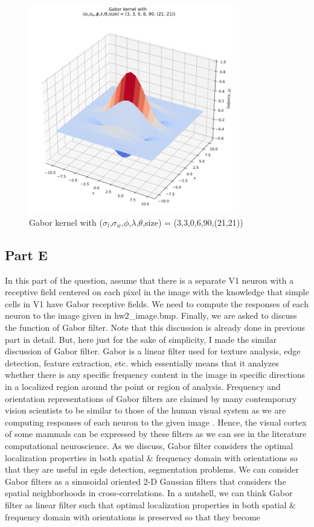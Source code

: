 \documentclass[12pt]{amsart}
\begin{document}
\begin{figure}[ht]
    \centering
    \includegraphics[width = 0.8\textwidth]{images/Gabor_90_3d.png}
    \caption{Gabor kernel with ($\sigma_l$,$\sigma_w$,$\phi$,$\lambda$,$\theta$,size) = (3,3,0,6,90,(21,21))}
\end{figure}

\subsection{Part E}
In this part of the question, assume that there is a separate V1 neuron with a receptive field centered on each pixel in the image with the knowledge that simple cells in V1 have Gabor receptive fields. We need to compute the responses of each neuron to the image given in hw2\_image.bmp. Finally, we are asked to discuss the function of Gabor filter. Note that this discussion is already done in previous part in detail. But, here just for the sake of simplicity, I made the similar discussion of Gabor filter. Gabor is a linear filter used for texture analysis, edge detection, feature extraction, etc. which essentially means that it analyzes whether there is any specific frequency content in the image in specific directions in a localized region around the point or region of analysis\cite{enwiki:993157632}. Frequency and orientation representations of Gabor filters are claimed by many contemporary vision scientists to be similar to those of the human visual system \cite{enwiki:993157632} as we are computing responses of each neuron to the given image . Hence, the visual cortex of some mammals can be expressed by these filters as we can see in the literature computational neuroscience. As we discuss, Gabor filter considers the optimal localization properties in both spatial \& frequency domain with orientations so that they are useful in egde detection, segmentation problems. We can consider Gabor filters as a sinusoidal oriented 2-D Gaussian filters that considers the spatial neighborhoods in cross-correlations. In a nutshell, we can think Gabor filter as linear filter such that optimal localization properties in both spatial \& frequency domain with orientations is preserved so that they become 
\end{document}
